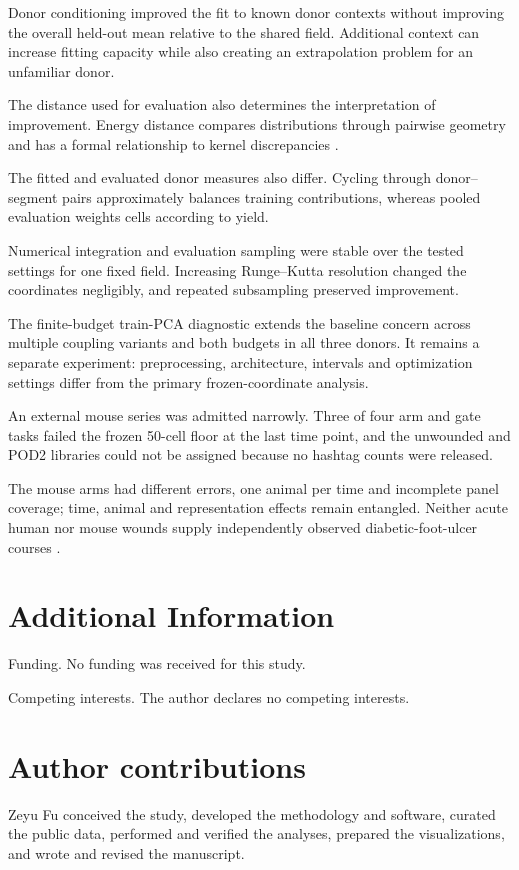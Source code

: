 \documentclass[10pt,a4paper]{article}
\begin{document}
Donor conditioning improved the fit to known donor contexts without improving the overall held-out mean relative to the shared field. Additional context can increase fitting capacity while also creating an extrapolation problem for an unfamiliar donor.

The distance used for evaluation also determines the interpretation of improvement. Energy distance compares distributions through pairwise geometry and has a formal relationship to kernel discrepancies \citep{szekely2013,sejdinovic2013}.

The fitted and evaluated donor measures also differ. Cycling through donor--segment pairs approximately balances training contributions, whereas pooled evaluation weights cells according to yield.

Numerical integration and evaluation sampling were stable over the tested settings for one fixed field. Increasing Runge--Kutta resolution changed the coordinates negligibly, and repeated subsampling preserved improvement.

The finite-budget train-PCA diagnostic extends the baseline concern across multiple coupling variants and both budgets in all three donors. It remains a separate experiment: preprocessing, architecture, intervals and optimization settings differ from the primary frozen-coordinate analysis.

An external mouse series was admitted narrowly. Three of four arm and gate tasks failed the frozen 50-cell floor at the last time point, and the unwounded and POD2 libraries could not be assigned because no hashtag counts were released.

The mouse arms had different errors, one animal per time and incomplete panel coverage; time, animal and representation effects remain entangled. Neither acute human nor mouse wounds supply independently observed diabetic-foot-ulcer courses \citep{armstrong2017}.

\section*{Additional Information}
Funding. No funding was received for this study.

Competing interests. The author declares no competing interests.

\section*{Author contributions}
Zeyu Fu conceived the study, developed the methodology and software, curated the public data, performed and verified the analyses, prepared the visualizations, and wrote and revised the manuscript.
\end{document}
